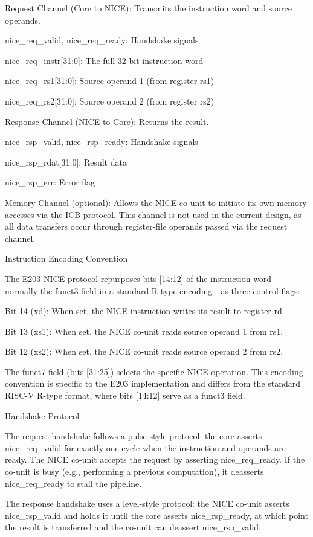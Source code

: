Request Channel (Core to NICE): Transmits the instruction word and source operands.


nice\_req\_valid, nice\_req\_ready: Handshake signals


nice\_req\_instr[31:0]: The full 32-bit instruction word


nice\_req\_rs1[31:0]: Source operand 1 (from register rs1)


nice\_req\_rs2[31:0]: Source operand 2 (from register rs2)


Response Channel (NICE to Core): Returns the result.


nice\_rsp\_valid, nice\_rsp\_ready: Handshake signals


nice\_rsp\_rdat[31:0]: Result data


nice\_rsp\_err: Error flag


Memory Channel (optional): Allows the NICE co-unit to initiate its own memory accesses via the ICB protocol. This channel is not used in the current design, as all data transfers occur through register-file operands passed via the request channel.


Instruction Encoding Convention


The E203 NICE protocol repurposes bits [14:12] of the instruction word—normally the funct3 field in a standard R-type encoding—as three control flags:


Bit 14 (xd): When set, the NICE instruction writes its result to register rd.


Bit 13 (xs1): When set, the NICE co-unit reads source operand 1 from rs1.


Bit 12 (xs2): When set, the NICE co-unit reads source operand 2 from rs2.


The funct7 field (bits [31:25]) selects the specific NICE operation. This encoding convention is specific to the E203 implementation and differs from the standard RISC-V R-type format, where bits [14:12] serve as a funct3 field.


Handshake Protocol


The request handshake follows a pulse-style protocol: the core asserts nice\_req\_valid for exactly one cycle when the instruction and operands are ready. The NICE co-unit accepts the request by asserting nice\_req\_ready. If the co-unit is busy (e.g., performing a previous computation), it deasserts nice\_req\_ready to stall the pipeline.


The response handshake uses a level-style protocol: the NICE co-unit asserts nice\_rsp\_valid and holds it until the core asserts nice\_rsp\_ready, at which point the result is transferred and the co-unit can deassert nice\_rsp\_valid.


